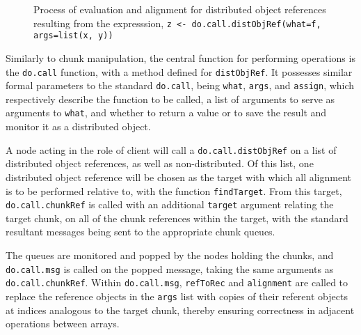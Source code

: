 \documentclass[a4paper,10pt]{article}
\begin{document}
\begin{figure}
	\caption{\label{fig:distobj}Process of evaluation and alignment for
	distributed object references resulting from the expresssion,
	\texttt{z <- do.call.distObjRef(what=f, args=list(x, y))}}
\end{figure}

Similarly to chunk manipulation, the central function for performing operations
is the \texttt{do.call} function, with a method defined for
\texttt{distObjRef}. It possesses similar formal parameters to the standard
\texttt{do.call}, being \texttt{what}, \texttt{args}, and
\texttt{assign}, which respectively describe the function to be called, a list
of arguments to serve as arguments to \texttt{what}, and whether to return a
value or to save the result and monitor it as a distributed object.

A node acting in the role of client will call a
\texttt{do.call.distObjRef} on a list of distributed object
references, as well as non-distributed.
Of this list, one distributed object reference will be chosen as the target
with which all alignment is to be performed relative to, with the function
\texttt{findTarget}.
From this target, \texttt{do.call.chunkRef} is called with an
additional \texttt{target} argument relating the target chunk, on all of the
chunk references within the target, with the standard resultant messages being
sent to the appropriate chunk queues.

The queues are monitored and popped by the nodes holding the chunks, and
\texttt{do.call.msg} is called on the popped message, taking the
same arguments as \texttt{do.call.chunkRef}.
Within \texttt{do.call.msg}, \texttt{refToRec}
and \texttt{alignment} are called to replace the reference
objects in the \texttt{args} list with copies of their referent objects at
indices analogous to the target chunk, thereby ensuring correctness in
adjacent operations between arrays.
\end{document}
